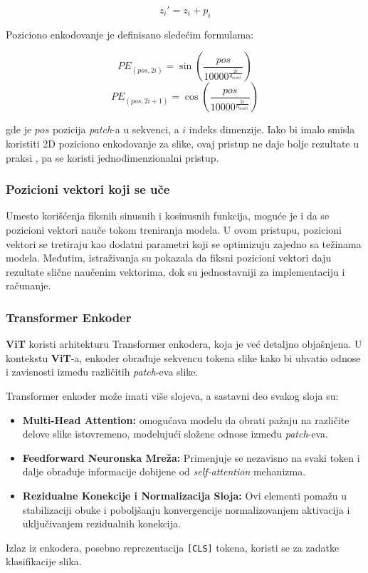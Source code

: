 \documentclass[12pt]{article}
\begin{document}
   \[
   z_i' = z_i + p_i
   \]

   Poziciono enkodovanje je definisano sledećim formulama:

   \[
   PE_{(pos, 2i)} = \sin\left(\frac{pos}{10000^{\frac{2i}{d_{model}}}}\right)
   \]
   \[
   PE_{(pos, 2i+1)} = \cos\left(\frac{pos}{10000^{\frac{2i}{d_{model}}}}\right)
   \]

   gde je \( pos \) pozicija \textit{patch}-a u sekvenci, a \( i \) indeks dimenzije. 
   Iako bi imalo smisla koristiti 2D poziciono enkodovanje za slike, ovaj pristup ne daje bolje
   rezultate u praksi \cite{vit}, pa se koristi jednodimenzionalni pristup.

   \subsubsection*{Pozicioni vektori koji se uče}
   Umesto korišćenja fiksnih sinusnih i kosinusnih funkcija, moguće je i da se 
   pozicioni vektori nauče tokom treniranja modela. U ovom pristupu, 
   pozicioni vektori se tretiraju kao dodatni parametri koji se optimizuju zajedno sa 
   težinama modela. Međutim, istraživanja su pokazala da fiksni pozicioni vektori daju 
   rezultate slične naučenim vektorima, dok su jednostavniji za implementaciju i računanje.


   \subsubsection{Transformer Enkoder}
   \textbf{ViT} koristi arhitekturu Transformer enkodera, koja je već detaljno objašnjena. U 
   kontekstu \textbf{ViT}-a, enkoder obrađuje sekvencu tokena slike kako bi uhvatio odnose 
   i zavisnosti između različitih \textit{patch}-eva slike.

   Transformer enkoder može imati više slojeva, a sastavni deo svakog sloja su:
\begin{itemize}
   \vspace{-0.5cm}
    \item \textbf{Multi-Head Attention:} omogućava modelu da obrati pažnju na različite 
    delove slike istovremeno, modelujući složene odnose između \textit{patch}-eva.
    \item \textbf{Feedforward Neuronska Mreža:} Primenjuje se nezavisno na svaki token i 
    dalje obrađuje informacije dobijene od \textit{self-attention} mehanizma.
    \item \textbf{Rezidualne Konekcije i Normalizacija Sloja:} Ovi elementi pomažu u 
    stabilizaciji obuke i poboljšanju konvergencije normalizovanjem aktivacija i 
    uključivanjem rezidualnih konekcija.
\end{itemize}
   Izlaz iz enkodera, posebno reprezentacija \texttt{[CLS]} tokena, koristi se za zadatke klasifikacije slika. 
\end{document}
